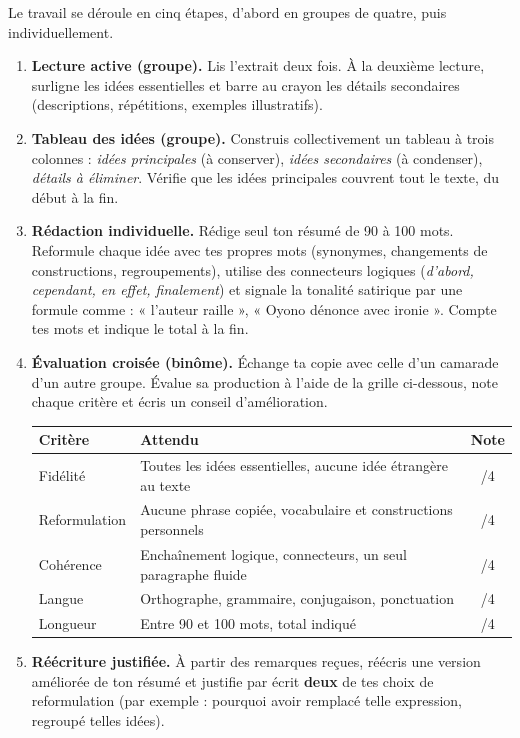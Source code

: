 \documentclass[11pt]{article}
\begin{document}
Le travail se déroule en cinq étapes, d'abord en groupes de quatre, puis individuellement.

\begin{enumerate}
\item \textbf{Lecture active (groupe).} Lis l'extrait deux fois. À la deuxième lecture, surligne les idées essentielles et barre au crayon les détails secondaires (descriptions, répétitions, exemples illustratifs).
\item \textbf{Tableau des idées (groupe).} Construis collectivement un tableau à trois colonnes : \emph{idées principales} (à conserver), \emph{idées secondaires} (à condenser), \emph{détails à éliminer}. Vérifie que les idées principales couvrent tout le texte, du début à la fin.
\item \textbf{Rédaction individuelle.} Rédige seul ton résumé de 90 à 100 mots. Reformule chaque idée avec tes propres mots (synonymes, changements de constructions, regroupements), utilise des connecteurs logiques (\emph{d'abord, cependant, en effet, finalement}) et signale la tonalité satirique par une formule comme : « l'auteur raille », « Oyono dénonce avec ironie ». Compte tes mots et indique le total à la fin.
\item \textbf{Évaluation croisée (binôme).} Échange ta copie avec celle d'un camarade d'un autre groupe. Évalue sa production à l'aide de la grille ci-dessous, note chaque critère et écris un conseil d'amélioration.
\begin{center}
\begin{tabularx}{\linewidth}{|l|X|c|}
\hline
\rowcolor{popblueL} \textbf{Critère} & \textbf{Attendu} & \textbf{Note} \\
\hline
Fidélité & Toutes les idées essentielles, aucune idée étrangère au texte & /4 \\
\hline
Reformulation & Aucune phrase copiée, vocabulaire et constructions personnels & /4 \\
\hline
Cohérence & Enchaînement logique, connecteurs, un seul paragraphe fluide & /4 \\
\hline
Langue & Orthographe, grammaire, conjugaison, ponctuation & /4 \\
\hline
Longueur & Entre 90 et 100 mots, total indiqué & /4 \\
\hline
\end{tabularx}
\end{center}
\item \textbf{Réécriture justifiée.} À partir des remarques reçues, réécris une version améliorée de ton résumé et justifie par écrit \textbf{deux} de tes choix de reformulation (par exemple : pourquoi avoir remplacé telle expression, regroupé telles idées).
\end{enumerate}
\end{document}
